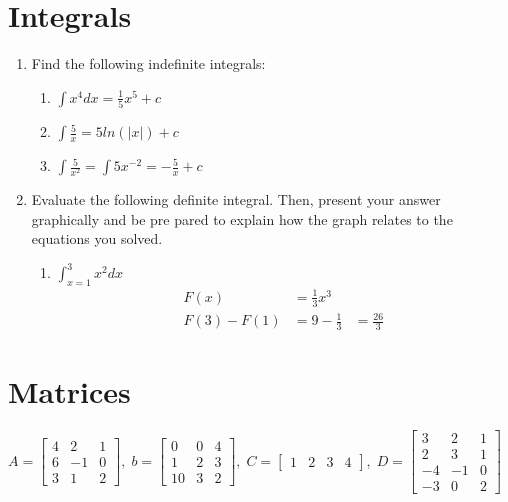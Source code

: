 \documentclass [12pt] {article}
\begin{document}
\section{Integrals}
\begin{enumerate}
    \item Find the following indefinite integrals:
    \begin{enumerate}
        \item $ \displaystyle \int x^4 dx = \frac{1}{5}x^5 + c $
        \item $\displaystyle \int \frac{5}{x} = 5ln(|x|) + c $
        \item $\displaystyle \int \frac{5}{x^2} = \int 5x^{-2} = -\frac{5}{x} + c$
    \end{enumerate}
\bigskip
    \item Evaluate the following definite integral. Then, present your answer graphically and be pre
pared to explain how the graph relates to the equations you solved. 
\begin{enumerate}

    \item $ \displaystyle \int_{x=1}^{3} x^2 dx $ 
    \begin{equation*}
    \begin{aligned}
    F(x) &= \frac{1}{3}x^3 \\
    F(3) - F(1) &= 9 - \frac{1}{3} &= \frac{26}{3}
    \end{aligned}
    \end{equation*}
\end{enumerate}
\end{enumerate}

\newpage
\section{Matrices}

$A = 
\begin{bmatrix}
    4 &2&1\\ 6&-1&0\\ 3&1&2
\end{bmatrix} 
, \;
b = 
\begin{bmatrix}
    0&0&4\\ 1&2&3 \\ 10&3&2
\end{bmatrix}
,\;
C = \begin{bmatrix}
    1&2&3&4
\end{bmatrix}
,\;
D = \begin{bmatrix}
    3&2&1 \\ 2&3&1 \\ -4&-1&0 \\ -3&0&2
\end{bmatrix}
$ \\ 
\end{document}
